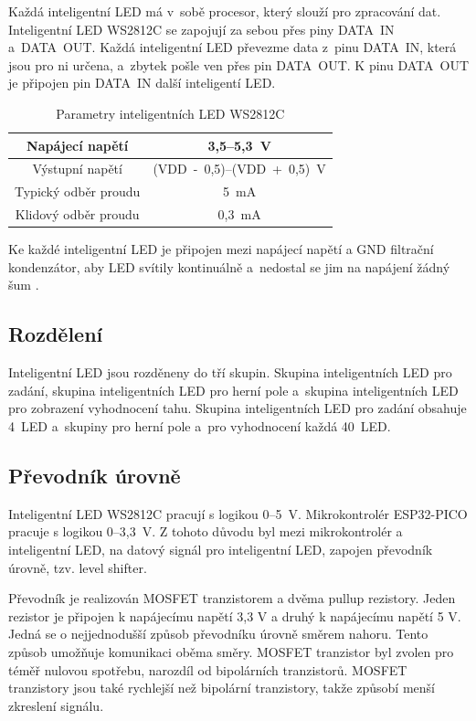   Každá inteligentní LED má v~sobě procesor, který slouží pro zpracování dat. 
  Inteligentní LED WS2812C se zapojují za sebou přes piny DATA~IN a~DATA~OUT. Každá inteligentní LED převezme data z~pinu 
  DATA~IN, která jsou pro ni určena, a~zbytek pošle ven přes pin DATA~OUT. K pinu DATA~OUT je připojen pin DATA~IN další inteligentí LED. 

  \begin{table}[!h]
    \caption{Parametry inteligentních LED WS2812C \cite{WS2812C_datasheet}}
    \begin{center}
        \begin{tabular}{|c|c|}
            \hline
            Napájecí napětí       & 3,5--5,3~V \\
            \hline
            Výstupní napětí       & (VDD~-~0,5)--(VDD~+~0,5)~V \\
            \hline
            Typický odběr proudu  & 5~mA \\
            \hline
            Klidový odběr proudu  & 0,3~mA \\
            \hline
        \end{tabular}    
    \end{center}
  \end{table}

  Ke každé inteligentní LED je připojen mezi napájecí napětí a GND filtrační kondenzátor, aby LED svítily kontinuálně 
  a~nedostal se jim na napájení žádný šum \cite{WS2812C_datasheet}.

  \subsection{Rozdělení}
  Inteligentní LED jsou rozděneny do tří skupin. Skupina inteligentních LED pro zadání, skupina inteligentních LED pro herní pole 
  a~skupina inteligentních LED pro zobrazení vyhodnocení tahu.
  Skupina inteligentních LED pro zadání obsahuje 4~LED a~skupiny pro herní pole a~pro vyhodnocení každá 40~LED.

  \subsection{Převodník úrovně}
  Inteligentní LED WS2812C pracují s logikou 0--5~V. Mikrokontrolér ESP32-PICO pracuje s logikou 0--3,3~V. 
  Z tohoto důvodu byl mezi mikrokontrolér a inteligentní LED, na datový signál pro inteligentní LED, zapojen převodník úrovně, 
  tzv. level shifter. 
  
  Převodník je realizován MOSFET tranzistorem a dvěma pullup rezistory. Jeden rezistor je připojen k napájecímu napětí 3,3 V a druhý k 
  napájecímu napětí 5 V. Jedná se o nejjednodušší způsob převodníku úrovně směrem nahoru. Tento způsob umožňuje komunikaci oběma směry. 
  MOSFET tranzistor byl zvolen pro téměř nulovou spotřebu, narozdíl od bipolárních tranzistorů. MOSFET tranzistory jsou také rychlejší 
  než bipolární tranzistory, takže způsobí menší zkreslení signálu. 

